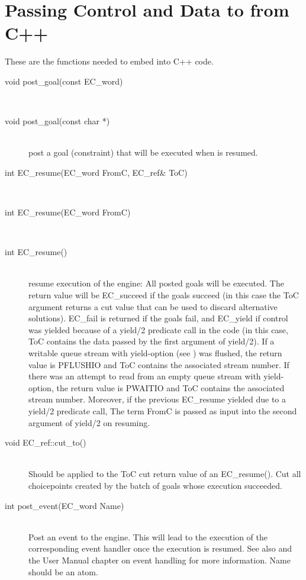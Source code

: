 \section{Passing Control and Data to {\eclipse} from C++}
These are the functions needed to embed {\eclipse} into C++ code.
\begin{description}
\item[void post_goal(const EC_word)]\ \\
\item[void post_goal(const char *)]\ \\
	post a goal (constraint) that will be executed when \eclipse
	is resumed.

\item[int EC_resume(EC_word FromC, EC_ref\& ToC)]\ \\
\item[int EC_resume(EC_word FromC)]\ \\
\item[int EC_resume()]\ \\
	resume execution of the {\eclipse} engine: All posted goals will
	be executed. The return value will be EC_succeed if the goals succeed
	(in this case the ToC argument returns a cut value that can be
	used to discard alternative solutions). EC_fail is returned if the
	goals fail, and EC_yield if control was yielded because of a
	yield/2 predicate call in the {\eclipse} code (in this case, ToC
	contains the data passed by the first argument of yield/2).
	If a writable queue stream with yield-option
	(see )
	was flushed, the return value is PFLUSHIO and ToC contains the
	associated stream number.
	If there was an attempt to read from an empty queue stream with
	yield-option, the return value is PWAITIO and ToC contains the
	associated stream number.
	Moreover, if the previous EC_resume yielded
	due to a yield/2 predicate call, The term FromC is passed
	as input into the second argument of yield/2 on resuming.

\item[void EC_ref::cut_to()]\ \\
	Should be applied to the ToC cut return value of an EC_resume().
	Cut all choicepoints created by the batch of goals whose execution
	succeeded.

\item[int post_event(EC_word Name)]\ \\
	Post an event to the {\eclipse} engine. This will lead to the
	execution of the corresponding event handler once the \eclipse
	execution is resumed. See also  and the User Manual
	chapter on event handling for more information. Name should be 
	an {\eclipse} atom.
\end{description}

